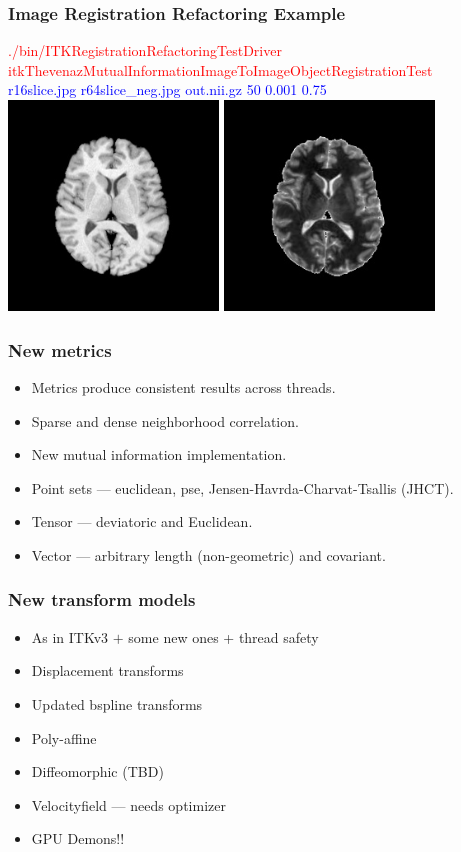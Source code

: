\begin{frame}
\frametitle{Image Registration Refactoring Example}
\textcolor{red}{./bin/ITKRegistrationRefactoringTestDriver itkThevenazMutualInformationImageToImageObjectRegistrationTest }\\
\textcolor{blue}{r16slice.jpg r64slice\_neg.jpg out.nii.gz  50 0.001 0.75 }\\
\includegraphics[height=2.2in]{../Art/r16slice.jpg}
\includegraphics[height=2.2in]{../Art/r64slice_neg_to_16.jpg}
\end{frame}

\begin{frame}
\frametitle{New metrics}
\Large
\begin{itemize}
\item Metrics produce consistent results across threads.
\item Sparse and dense neighborhood correlation.
\item New mutual information implementation.
\item Point sets ---  euclidean, pse, Jensen-Havrda-Charvat-Tsallis (JHCT).
\item Tensor --- deviatoric and Euclidean.
\item Vector --- arbitrary length (non-geometric) and covariant.
\end{itemize}
\end{frame}

\begin{frame}
\frametitle{New transform models}
\Large
\begin{itemize}
\item As in ITKv3 $+$ some new ones + thread safety 
\item Displacement transforms
\item Updated bspline transforms
\item Poly-affine
\item Diffeomorphic (TBD)
\item Velocityfield --- needs optimizer
\item GPU Demons!!
\end{itemize}
\end{frame}

